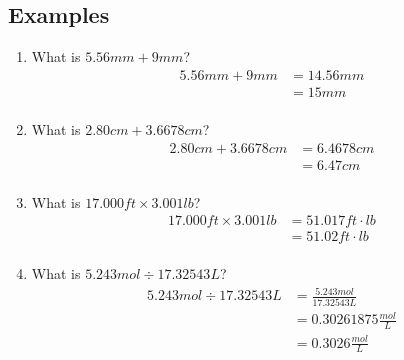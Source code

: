 \documentclass[11pt, oneside]{article}   	%
\begin{document}
\subsection{Examples}
\begin{enumerate}[label=Example \arabic*]
\item What is $5.56 mm + 9 mm$?
\begin{equation} 
\boxed{
\begin{split}
    5.56 mm + 9 mm &= 14.56 mm \\
                                &= 15 mm \\
 \end{split}
 }
 \end{equation}
 
\item  What is $2.80 cm + 3.6678 cm$?
\begin{equation} 
\boxed{
\begin{split}
    2.80 cm + 3.6678 cm &= 6.4678 cm \\
                           &= 6.47 cm \\
 \end{split}
 }
\end{equation}

\item What is $17.000 ft \times 3.001 lb$?
\begin{equation} 
\boxed{
\begin{split}
    17.000 ft \times 3.001 lb &= 51.017 ft \cdot lb \\
                                           &= 51.02 ft \cdot lb  \\
 \end{split}
 }
 \end{equation}

\item What is $ 5.243 mol \div 17.32543 L$?
\begin{equation} 
\boxed{
\begin{split}
        5.243 mol \div 17.32543 L &=  \frac{5.243 mol}{17.32543 L} \\
                                                  &= 0.30261875 \frac{mol}{L} \\
                                                  &= 0.3026 \frac{mol}{L} 
 \end{split}
 }
 \end{equation}

\end{enumerate}
\end{document}
